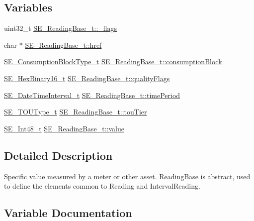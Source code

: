 \subsection*{Variables}
\begin{DoxyCompactItemize}
\item 
uint32\+\_\+t \hyperlink{group__ReadingBase_ga31f65241519527acecdbec97ead29d78}{S\+E\+\_\+\+Reading\+Base\+\_\+t\+::\+\_\+flags}
\item 
char $\ast$ \hyperlink{group__ReadingBase_ga5750523127b69f62ba464b3a300e2012}{S\+E\+\_\+\+Reading\+Base\+\_\+t\+::href}
\item 
\hyperlink{group__ConsumptionBlockType_ga526f797922e4c3009d50c28f457c462e}{S\+E\+\_\+\+Consumption\+Block\+Type\+\_\+t} \hyperlink{group__ReadingBase_ga92c363358c08a8377a2bc6fa4c2bbfca}{S\+E\+\_\+\+Reading\+Base\+\_\+t\+::consumption\+Block}
\item 
\hyperlink{group__HexBinary16_gac040be0e918a360be6bcf5e8b8ad2c49}{S\+E\+\_\+\+Hex\+Binary16\+\_\+t} \hyperlink{group__ReadingBase_gadb77e76eaaa912c124844cb44f5fa473}{S\+E\+\_\+\+Reading\+Base\+\_\+t\+::quality\+Flags}
\item 
\hyperlink{structSE__DateTimeInterval__t}{S\+E\+\_\+\+Date\+Time\+Interval\+\_\+t} \hyperlink{group__ReadingBase_gae16dcf4680bc1bdc74ce0a8b3e90919f}{S\+E\+\_\+\+Reading\+Base\+\_\+t\+::time\+Period}
\item 
\hyperlink{group__TOUType_gadcfd871f87df34ae8228b9484ebedc6a}{S\+E\+\_\+\+T\+O\+U\+Type\+\_\+t} \hyperlink{group__ReadingBase_ga610ccfbc828fc2c3c75d65739dab5991}{S\+E\+\_\+\+Reading\+Base\+\_\+t\+::tou\+Tier}
\item 
\hyperlink{group__Int48_ga87620025dc9f6c732fa48fcab95861ce}{S\+E\+\_\+\+Int48\+\_\+t} \hyperlink{group__ReadingBase_ga5bf0963cd698da8a48200e661ca04fcc}{S\+E\+\_\+\+Reading\+Base\+\_\+t\+::value}
\end{DoxyCompactItemize}


\subsection{Detailed Description}
Specific value measured by a meter or other asset. Reading\+Base is abstract, used to define the elements common to Reading and Interval\+Reading. 

\subsection{Variable Documentation}
\mbox{\label{group__ReadingBase_ga31f65241519527acecdbec97ead29d78}} 
